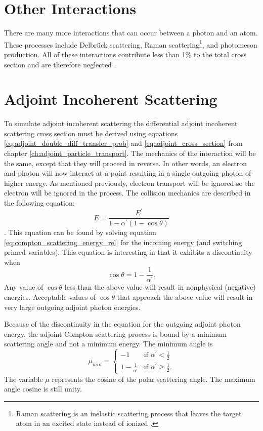 \section{Other Interactions}
There are many more interactions that can occur between a photon and an atom.
These processes include Delbr\"{u}ck scattering, Raman scattering\footnote{Raman scattering is an inelastic scattering process that leaves the target atom in an excited state instead of ionized \citep{cullen_epdl97_1997}.}, and 
photomeson production. All of these interactions contribute less than 1\% to the
total cross section and are therefore neglected \citep{lux_monte_1991}.

\section{Adjoint Incoherent Scattering}
To simulate adjoint incoherent scattering the differential adjoint incoherent 
scattering cross section must be derived using equations 
\ref{eq:adjoint_double_diff_transfer_prob} and \ref{eq:adjoint_cross_section}
from chapter \ref{ch:adjoint_particle_transport}. The mechanics of the 
interaction will be the same, except that they will proceed in reverse. In 
other words, an electron and photon will now interact at a point resulting in a 
single outgoing photon of higher energy. As mentioned previously, electron 
transport will be ignored so the electron will be ignored in the process. The 
collision mechanics are described in the following equation: 
\begin{equation}
  E = \frac{E^{'}}{1-\alpha^{'}(1-\cos{\theta})}
\label{eq:adjoint_energy_angle_relation}
\end{equation}
\citep{gabler_amos_2006}. This equation can be found by solving equation 
\ref{eq:compton_scattering_energy_rel} for the incoming energy (and switching
primed variables). This equation is interesting in that it exhibits a 
discontinuity when 
\begin{equation}
  \cos{\theta} = 1 - \frac{1}{\alpha^{'}}.
\end{equation}
Any value of $\cos{\theta}$ less than the above value will result in nonphysical
(negative) energies. Acceptable values of $\cos{\theta}$ that approach the 
above value will result in very large outgoing adjoint photon energies. 

Because of the discontinuity in the equation for the outgoing adjoint photon
energy, the adjoint Compton scattering process is bound by a minimum scattering
angle and not a minimum energy. The minimum angle is 
\begin{equation}
  \mu_{min} = 
  \begin{cases}
    -1 & \text{if } \alpha^{'} < \frac{1}{2} \\
    1 - \frac{1}{\alpha^{'}} & \text{if } \alpha^{'} \geq \frac{1}{2}.
  \end{cases}
\end{equation}
The variable $\mu$ represents the cosine of the polar scattering angle.
The maximum angle cosine is still unity.

